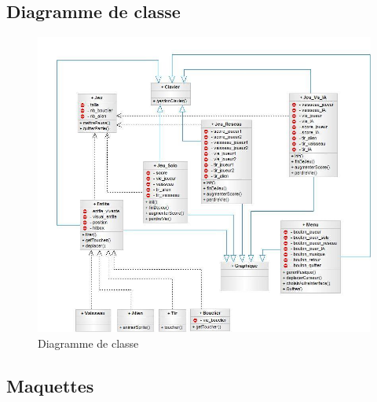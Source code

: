 \documentclass[french, 11pt]{article}
\begin{document}
			\subsection{Diagramme de classe}
			\begin{figure}[h]
				\centering
				\includegraphics[width=1\linewidth]{DiagrammeDeClasse}
				\caption{Diagramme de classe}
			\end{figure}
			\newpage
			\subsection{Maquettes}
			
\end{document}
